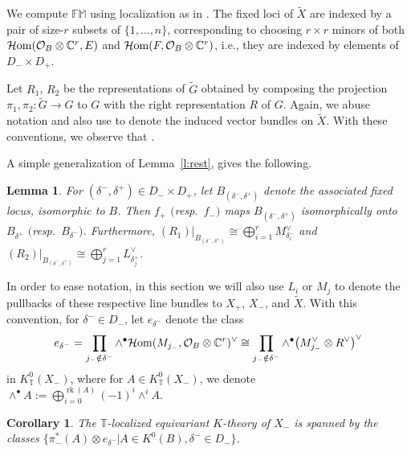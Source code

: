 \documentclass[pdftex]{sigma}
\newtheorem{Corollary}[Theorem]{Corollary}
\newtheorem{Lemma}[Theorem]{Lemma}
\numberwithin{equation}{section}
\newcommand{\cc}[1]{\mathcal{#1}} %
\newcommand{\CC}{\mathbb{C}}
\newcommand{\torus}{\mathbb{T}}
\newcommand{\FM}{\mathbb{FM}}
\newcommand{\op}[1]{\operatorname{#1}}
\newcommand{\F}{F}
\newcommand{\E}{E}
\newcommand{\MB}{M}
\newcommand{\LB}{L}
\begin{document}
We compute $\FM $ using localization as in \cite{Thomason}.
The fixed loci of $\tilde X$ are indexed by a pair of size-$r$ subsets of $\{1, \dots, n\}$,
corresponding to choosing $r \times r$ minors of both $\mathcal{H}{\rm om}(\cc O_B \otimes \CC^r, \E)$ and $\mathcal{H}{\rm om}(\F, \cc O_B \otimes \CC^r)$, i.e., they are indexed by elements of $D_- \times D_+$.

Let $R_1$, $R_2$ be the representations of $\tilde G$ obtained by composing the projection $\pi_1, \pi_2\colon \tilde G \to G$ to $G$ with the right representation $R$ of $G$. Again, we abuse notation and also use  to denote the induced vector bundles on $\tilde X$.
With these conventions, we observe that .


A simple generalization of Lemma~\ref{l:rest}, gives the following.
\begin{Lemma}\label{l:rest2}
For $(\delta^-, \delta^+) \in D_{-} \times D_{+}$,
let $B_{(\delta^-, \delta^+)} $ denote the associated fixed locus, isomorphic to $B$. Then $f_{+}$ $($resp.\ $f_-)$ maps $B_{(\delta^-, \delta^+)} $ isomorphically onto $B_{\delta^+}$ $($resp.\ $B_{\delta^-})$. Furthermore,
$(R_1)|_{B_{(\delta^-, \delta^+)}} \cong \bigoplus_{i=1}^r \MB_{\delta^-_i}^\vee$ and $(R_2)|_{B_{(\delta^-, \delta^+)}} \cong \bigoplus_{j=1}^r \LB_{\delta^+_j}^\vee$.
\end{Lemma}




In order to ease notation, in this section we will also use $L_i$ or $M_j$ to denote the pullbacks of these respective line bundles to $X_+$, $X_-$, and $\tilde X.$
With this convention, for $\delta^- \in D_-$, let $e_{\delta^-}$ denote the class{\samepage
\begin{align}
e_{\delta^-} = \prod_{j_- \notin \delta^-} \wedge^\bullet \mathcal{H}{\rm om}(\MB_{j_-}, \cc O_B \otimes \CC^r)^\vee
\cong \prod_{j_- \notin \delta^-} \wedge^\bullet \bigl(\MB_{j_-}^\vee \otimes R^\vee\bigr)^\vee \label{edm}
\end{align}
in $K^0_\torus(X_-)$, where for $A \in K^0_\torus(X_-)$, we denote $\wedge^\bullet A := \bigoplus_{i=0}^{\op{rk}(A)} (-1)^i \wedge^i A$.}



\begin{Corollary}\label{c:gen}
The $\torus$-localized equivariant $K$-theory of $X_-$ is spanned by the classes $\bigl\{\pi_-^*(A) \otimes e_{\delta^-} | A \in K^0(B), \delta^- \in D_{-}\bigr\}$.
\end{Corollary}
\end{document}
